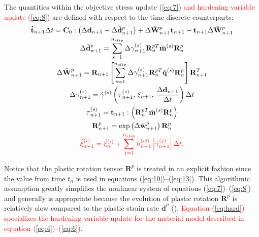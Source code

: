 \documentclass[review]{elsarticle}
\begin{document}
	The quantities within the objective stress update (\ref{eq:7}) \textcolor{red}{and hardening variable update (\ref{eq:8})} are defined with respect to the time discrete counterparts:
	\begin{gather}
	\allowdisplaybreaks
	\mathbf{\dot{t}}_{n+1}\Delta t = \mathbf{C}_0 : \left( \Delta\mathbf{d}_{n+1} - \Delta\bar{\mathbf{d}}{_{n+1}^p} \right) + \Delta\bar{\mathbf{W}}{_{n+1}^p}\mathbf{t}_{n+1} - \mathbf{t}_{n+1}\Delta\bar{\mathbf{W}}{_{n+1}^p}\\
	\Delta\bar{\mathbf{d}}{_{n+1}^p} = \sum_{s=1}^{n_{slip}} \Delta \gamma{_{n+1}^{(s)}} \mathbf{R}{_n^{pT}}\tilde{\mathbf{m}}^{(s)}\mathbf{R}{_n^p}
	\label{eq:10} \\
	\Delta\bar{\mathbf{W}}{_{n+1}^p} = \mathbf{R}_{n+1} \left[ \sum_{s=1}^{n_{slip}} \Delta \gamma{_{n+1}^{(s)}} \mathbf{R}{_n^{pT}}\tilde{\mathbf{q}}^{(s)}\mathbf{R}{_n^p} \right] \mathbf{R}{_{n+1}^T}\\
	\Delta\gamma{_{n+1}^{(s)}} = \dot{\gamma}^{(s)} \left( \tau{_{n+1}^{(s)}} ,\, \xi_{n+1} ,\, \frac{\Delta\mathbf{d}_{n+1}}{\Delta t} \right)\Delta t\\
	\tau{_{n+1}^{(s)}} = \mathbf{t}_{n+1}:\left( \mathbf{R}{_n^{pT}} \tilde{\mathbf{m}}^{(s)} \mathbf{R}{_n^p} \right)
	\label{eq:13} \\
	\mathbf{R}{_{n+1}^p} = \exp \left( \Delta\bar{\mathbf{w}}{_{n+1}^p} \right) \mathbf{R}{_n^p}\\
	\textcolor{red}{
	\dot{\xi}^{(i)}_{n+1} = \dot{\xi}^{(i)}_{n} + \sum_{j=1}^{n_{slip}} h^{(ij)}_{n+1} \left| \dot{\gamma}^{(j)}_{n+1} \right| \Delta t.
	\label{eq:hard}
	}
	\end{gather}
	
	Notice that the plastic rotation tensor $\mathbf{R}^p$ is treated in an explicit fashion since the value from time $t_n$ is used in equations (\ref{eq:10})--(\ref{eq:13}).
	This algorithmic assumption greatly simplifies the nonlinear system of equations (\ref{eq:7})--(\ref{eq:8}) and generally is appropriate because the evolution of plastic rotation $\mathbf{R}^p$ is relatively slow compared to the plastic strain rate $\bar{\mathbf{d}}^p$ (\cite{r22}).
	\textcolor{red}{Equation (\ref{eq:hard}) specializes the hardening variable update for the material model described in equation (\ref{eq:4})--(\ref{eq:6}).}
	
\end{document}
